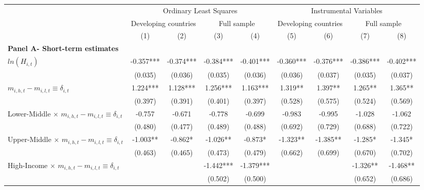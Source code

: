 \begin{tabular}{lcccccccc}
\toprule\toprule
 & \multicolumn{4}{c}{Ordinary Least Squares} & \multicolumn{4}{c}{Instrumental Variables} \\ \cmidrule(lr){2-5} \cmidrule(lr){6-9}  & \multicolumn{2}{c}{Developing countries} & \multicolumn{2}{c}{Full sample}  & \multicolumn{2}{c}{Developing countries} & \multicolumn{2}{c}{Full sample} \\ & (1) & (2) & (3) & (4) & (5) & (6) & (7) & (8) \\
\midrule
\multicolumn{4}{l}{\textbf{Panel A- Short-term estimates}} \\
$ ln(H_{i,t}) $     &      -0.357***&      -0.374***&      -0.384***&      -0.401***&      -0.360***&      -0.376***&      -0.386***&      -0.402***\\
                    &     (0.035)   &     (0.036)   &     (0.035)   &     (0.036)   &     (0.036)   &     (0.037)   &     (0.035)   &     (0.037)   \\
$ m_{i,h,t}-m_{i,l,t} \equiv \delta_{i,t} $&       1.224***&       1.128***&       1.256***&       1.163***&       1.319** &       1.397** &       1.265** &       1.365** \\
                    &     (0.397)   &     (0.391)   &     (0.401)   &     (0.397)   &     (0.528)   &     (0.575)   &     (0.524)   &     (0.569)   \\
Lower-Middle $\times$ $ m_{i,h,t}-m_{i,l,t} \equiv \delta_{i,t} $&      -0.757   &      -0.671   &      -0.778   &      -0.699   &      -0.983   &      -0.995   &      -1.028   &      -1.062   \\
                    &     (0.480)   &     (0.477)   &     (0.489)   &     (0.488)   &     (0.692)   &     (0.729)   &     (0.688)   &     (0.722)   \\
Upper-Middle $\times$ $ m_{i,h,t}-m_{i,l,t} \equiv \delta_{i,t} $&      -1.003** &      -0.862*  &      -1.026** &      -0.873*  &      -1.323** &      -1.385** &      -1.285*  &      -1.345*  \\
                    &     (0.463)   &     (0.465)   &     (0.473)   &     (0.479)   &     (0.662)   &     (0.699)   &     (0.670)   &     (0.702)   \\
High-Income $\times$ $ m_{i,h,t}-m_{i,l,t} \equiv \delta_{i,t} $&               &               &      -1.442***&      -1.379***&               &               &      -1.326** &      -1.468** \\
                    &               &               &     (0.502)   &     (0.500)   &               &               &     (0.652)   &     (0.686)   \\

\end{tabular}
